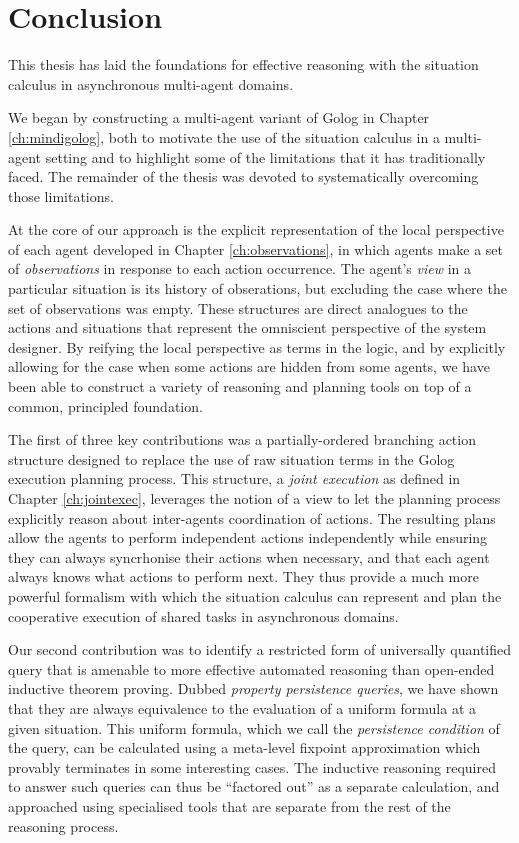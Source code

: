 

\chapter{Conclusion}

\label{ch:conclusion}

This thesis has laid the foundations for effective reasoning with
the situation calculus in asynchronous multi-agent domains.

We began by constructing a multi-agent variant of Golog in Chapter
\ref{ch:mindigolog}, both to motivate the use of the situation calculus
in a multi-agent setting and to highlight some of the limitations
that it has traditionally faced. The remainder of the thesis was devoted
to systematically overcoming those limitations.

At the core of our approach is the explicit representation of the
local perspective of each agent developed in Chapter \ref{ch:observations},
in which agents make a set of \emph{observations} in response to each
action occurrence. The agent's \emph{view} in a particular situation
is its history of obserations, but excluding the case where the set
of observations was empty. These structures are direct analogues to
the actions and situations that represent the omniscient perspective
of the system designer. By reifying the local perspective as terms
in the logic, and by explicitly allowing for the case when some actions
are hidden from some agents, we have been able to construct a variety
of reasoning and planning tools on top of a common, principled foundation.

The first of three key contributions was a partially-ordered branching
action structure designed to replace the use of raw situation terms
in the Golog execution planning process. This structure, a \emph{joint
execution} as defined in Chapter \ref{ch:jointexec}, leverages the
notion of a view to let the planning process explicitly reason about
inter-agents coordination of actions. The resulting plans allow the
agents to perform independent actions independently while ensuring
they can always syncrhonise their actions when necessary, and that
each agent always knows what actions to perform next. They thus provide
a much more powerful formalism with which the situation calculus can
represent and plan the cooperative execution of shared tasks in asynchronous
domains.

Our second contribution was to identify a restricted form of universally
quantified query that is amenable to more effective automated reasoning
than open-ended inductive theorem proving. Dubbed \emph{property persistence
queries}, we have shown that they are always equivalence to the evaluation
of a uniform formula at a given situation. This uniform formula, which
we call the \emph{persistence condition} of the query, can be calculated
using a meta-level fixpoint approximation which provably terminates
in some interesting cases. The inductive reasoning required to answer
such queries can thus be {}``factored out'' as a separate calculation,
and approached using specialised tools that are separate from the
rest of the reasoning process.

